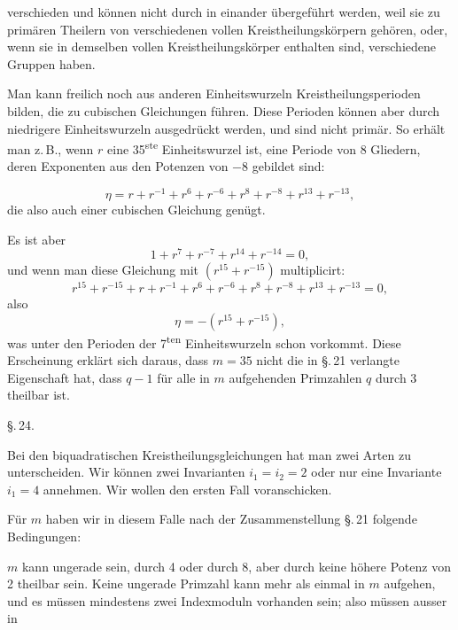 verschieden und können nicht durch  in einander übergeführt werden, weil sie zu primären Theilern von verschiedenen vollen Kreistheilungskörpern gehören, oder, wenn sie in demselben vollen Kreistheilungskörper enthalten sind, verschiedene Gruppen haben.

Man kann freilich noch aus anderen Einheitswurzeln Kreistheilungsperioden bilden, die zu cubischen Gleichungen führen. Diese Perioden können aber durch niedrigere Einheitswurzeln ausgedrückt werden, und sind nicht primär. So erhält man z.\,B., wenn $r$ eine 35\textsuperscript{ste} Einheitswurzel ist, eine Periode von 8 Gliedern, deren Exponenten aus den Potenzen von $-8$ gebildet sind:

\[
\eta = r + r^{-1} + r^6 + r^{-6} + r^8 + r^{-8} + r^{13} + r^{-13},
\]
die also auch einer cubischen Gleichung genügt.

Es ist aber
\[
1 + r^7 + r^{-7} + r^{14} + r^{-14} = 0,
\]
und wenn man diese Gleichung mit $(r^{15} + r^{-15})$ multiplicirt:
\[
r^{15} + r^{-15} + r + r^{-1} + r^6 + r^{-6} + r^8 + r^{-8} + r^{13} + r^{-13} = 0,
\]
also
\[
\eta = -(r^{15} + r^{-15}),
\]
was unter den Perioden der 7\textsuperscript{ten} Einheitswurzeln schon vorkommt. Diese Erscheinung erklärt sich daraus, dass $m = 35$ nicht die in \S.\,21 verlangte Eigenschaft hat, dass $q - 1$ für alle in $m$ aufgehenden Primzahlen $q$ durch 3 theilbar ist.

\begin{center}
\S.\,24.

\end{center}

Bei den biquadratischen Kreistheilungsgleichungen hat man zwei Arten zu unterscheiden. Wir können zwei Invarianten $i_1 = i_2 = 2$ oder nur eine Invariante $i_1 = 4$ annehmen. Wir wollen den ersten Fall voranschicken.

Für $m$ haben wir in diesem Falle nach der Zusammenstellung \S.\,21 folgende Bedingungen:

$m$ kann ungerade sein, durch 4 oder durch 8, aber durch keine höhere Potenz von 2 theilbar sein. Keine ungerade Primzahl kann mehr als einmal in $m$ aufgehen, und es müssen mindestens zwei Indexmoduln vorhanden sein; also müssen ausser in
